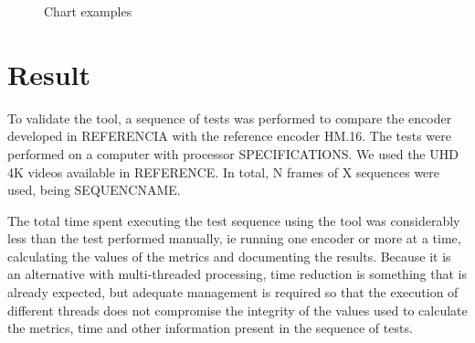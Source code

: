 \documentclass{acm_proc_article-sp}
\begin{document}
\FloatBarrier
\begin{figure}[!htb]
	\centering
	\quad %
	\caption{Chart examples}
	\label{fig01}
\end{figure}
\FloatBarrier

	


\section{Result}

To validate the tool, a sequence of tests was performed to compare the encoder developed in REFERENCIA with the reference encoder HM.16. The tests were performed on a computer with processor SPECIFICATIONS. We used the UHD 4K videos available in REFERENCE. In total, N frames of X sequences were used, being SEQUENCNAME.


The total time spent executing the test sequence using the tool was considerably less than the test performed manually, ie running one encoder or more at a time, calculating the values of the metrics and documenting the results. Because it is an alternative with multi-threaded processing, time reduction is something that is already expected, but adequate management is required so that the execution of different threads does not compromise the integrity of the values used to calculate the metrics, time and other information present in the sequence of tests.







\end{document}
